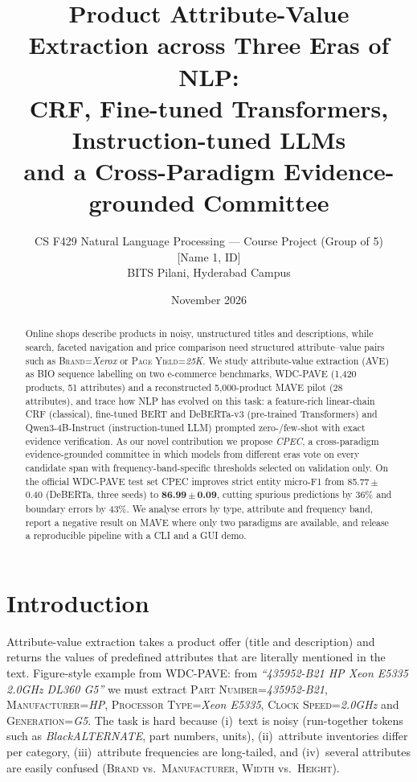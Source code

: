 \documentclass[10pt,twocolumn,a4paper]{article}
\title{\textbf{Product Attribute-Value Extraction across Three Eras of NLP:\\CRF, Fine-tuned Transformers, Instruction-tuned LLMs\\and a Cross-Paradigm Evidence-grounded Committee}}
\author{CS F429 Natural Language Processing --- Course Project (Group of 5)\\
\small [Name 1, ID] \quad [Name 2, ID] \quad [Name 3, ID] \quad [Name 4, ID] \quad [Name 5, ID]\\
\small BITS Pilani, Hyderabad Campus}
\date{November 2026}
\begin{document}
\maketitle

\begin{abstract}
Online shops describe products in noisy, unstructured titles and descriptions, while search, faceted navigation and price comparison need structured attribute--value pairs such as \textsc{Brand}=\emph{Xerox} or \textsc{Page Yield}=\emph{25K}. We study attribute-value extraction (AVE) as BIO sequence labelling on two e-commerce benchmarks, WDC-PAVE (1,420 products, 51 attributes) and a reconstructed 5,000-product MAVE pilot (28 attributes), and trace how NLP has evolved on this task: a feature-rich linear-chain CRF (classical), fine-tuned BERT and DeBERTa-v3 (pre-trained Transformers) and Qwen3-4B-Instruct (instruction-tuned LLM) prompted zero-/few-shot with exact evidence verification. As our novel contribution we propose \emph{CPEC}, a cross-paradigm evidence-grounded committee in which models from different eras vote on every candidate span with frequency-band-specific thresholds selected on validation only. On the official WDC-PAVE test set CPEC improves strict entity micro-F1 from 85.77\,$\pm$\,0.40 (DeBERTa, three seeds) to \textbf{86.99\,$\pm$\,0.09}, cutting spurious predictions by 36\% and boundary errors by 43\%. We analyse errors by type, attribute and frequency band, report a negative result on MAVE where only two paradigms are available, and release a reproducible pipeline with a CLI and a GUI demo.
\end{abstract}

\section{Introduction}
Attribute-value extraction takes a product offer (title and description) and returns the values of predefined attributes that are literally mentioned in the text. Figure-style example from WDC-PAVE: from \emph{``435952-B21 HP Xeon E5335 2.0GHz DL360 G5''} we must extract \textsc{Part Number}=\emph{435952-B21}, \textsc{Manufacturer}=\emph{HP}, \textsc{Processor Type}=\emph{Xeon E5335}, \textsc{Clock Speed}=\emph{2.0GHz} and \textsc{Generation}=\emph{G5}. The task is hard because (i)~text is noisy (run-together tokens such as \emph{BlackALTERNATE}, part numbers, units), (ii)~attribute inventories differ per category, (iii)~attribute frequencies are long-tailed, and (iv)~several attributes are easily confused (\textsc{Brand} vs.\ \textsc{Manufacturer}, \textsc{Width} vs.\ \textsc{Height}).
\end{document}
